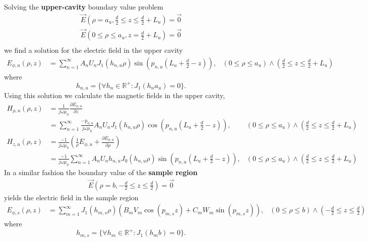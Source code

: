 Solving the \textbf{upper-cavity} boundary value problem
\begin{gather}
\vec{E}\left(\rho=a_u,\frac{d}{2}\leq z\leq\frac{d}{2}+L_u\right)=\vec{0}\\
\vec{E}\left(0\leq\rho\leq a_u,z=\frac{d}{2}+L_u\right)=\vec{0}\\
\end{gather}
we find a solution for the electric field in the upper cavity
\begin{align}\label{eq:e_u}
E_{\phi,u}(\rho,z)&=\sum\limits_{n=1}^{\infty} A_nU_nJ_1(h_{n,u}\rho)\sin(p_{n,u}\left(L_u+\frac{d}{2}-z\right)), &\scriptstyle (0\leq\rho\leq a_u)\wedge\left(\frac{d}{2}\leq z\leq\frac{d}{2}+L_u\right)
\end{align}
where
\begin{equation}
h_{n,u}=\{\forall h_n\in\mathbb{R}^+:J_1(h_na_u)=0\}\text{.}
\end{equation}
Using this solution we calculate the magnetic fields in the upper cavity,
\begin{align}\label{eq:h_u}
H_{\rho,u}(\rho,z)&=\frac{1}{j\omega\mu_0}\frac{\partial E_{\phi,u}}{\partial z}\\&=\sum\limits_{n=1}^{\infty}\frac{-p_{n,u}}{j\omega\mu_0}A_nU_nJ_1(h_{n,u}\rho)\cos(p_{n,u}\left(L_u+\frac{d}{2}-z\right)),&\scriptstyle\left(0\leq\rho\leq a_u\right)\wedge\left(\frac{d}{2}\leq z\leq\frac{d}{2}+L_u\right)\\
H_{z,u}(\rho,z)&=\frac{-1}{j\omega\mu_0}\left(\frac{1}{\rho}E_{\phi,u}+\frac{\partial E_{\phi,u}}{\partial\rho}\right)\\&=\frac{-1}{j\omega\mu_0}\sum\limits_{n=1}^\infty A_nU_nh_{n,u}J_0(h_{n,u}\rho)\sin(p_{n,u}\left(L_u+\frac{d}{2}-z\right)),&\scriptstyle(0\leq\rho\leq a_u)\wedge\left(\frac{d}{2}\leq z\leq\frac{d}{2}+L_u\right)
\end{align}
In a similar fashion the boundary value of the \textbf{sample region}
\begin{gather}
\vec{E}\left(\rho=b,-\frac{d}{2}\leq z\leq\frac{d}{2}\right)=\vec{0}
\end{gather}
yields the electric field in the sample region
\begin{align}\label{eq:e_s}
E_{\phi,s}(\rho,z)&=\sum\limits_{m=1}^{\infty} J_1(h_{m,s}\rho)\left(B_mV_m\cos(p_{m,s}z)+C_mW_m\sin(p_{m,s}z)\right),&\scriptstyle(0\leq\rho\leq b)\wedge\left(-\frac{d}{2}\leq z\leq\frac{d}{2}\right)
\end{align}
where
\begin{equation}
h_{m,s}=\{\forall h_m\in\mathbb{R}^+:J_1(h_mb)=0\}\text{.}
\end{equation}
